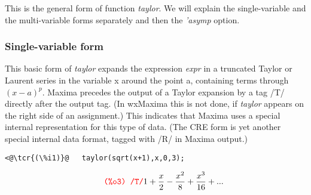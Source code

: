 \documentclass[../Maxima_Workbook.tex]{subfiles}
\begin{document}
\lz {} \hfill \tcr{[function]}

\lz {}



\lz {}


\lz This is the general form of function \emph{taylor}. We will explain the single-variable and the multi-variable forms separately and then the \emph{'asymp} option.

\subsubsection{Single-variable form}

\lz {} \hfill \tcr{[function]}

\lz This basic form of \emph{taylor} expands the expression \emph{expr} in a truncated Taylor or Laurent series in the variable x around the point a, containing terms through $ (x - a)^p $. Maxima precedes the output of a Taylor expansion by a tag /T/ directly after the output tag. (In wxMaxima this is not done, if \emph{taylor} appears on the right side of an assignment.) This indicates that Maxima uses a special internal representation for this type of data. (The CRE form is yet another special internal data format, tagged with /R/ in Maxima output.)

\lz \begin{small}
\color{blue} \leqn
\begin{lstlisting}
<@\tcr{(\%i1)}@   taylor(sqrt(x+1),x,0,3);
\end{lstlisting}
\vspace{-6mm} \[ \tag*{\tcr{\ttfamily (\%o3) /T/}} 1+\frac{x}{2}-\frac{{{x}^{2}}}{8}+\frac{{{x}^{3}}}{16}+\mbox{...} \]
\color{black} \reqn
\end{small} \vspace{-4mm} 
\end{document}
